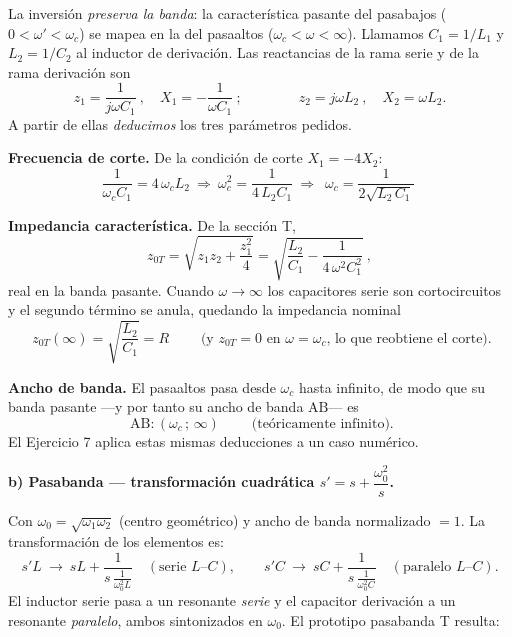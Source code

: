 \documentclass[class=article, crop=false, oneside]{standalone}
\begin{document}
\begin{figure}[H]
    \centering
    
\end{figure}

\noindent La inversión \emph{preserva la banda}: la característica pasante del
pasabajos ($0<\omega'<\omega_c$) se mapea en la del pasaaltos ($\omega_c<\omega<\infty$).
Llamamos $C_1 = 1/L_1$ y $L_2 = 1/C_2$ al inductor de derivación. Las reactancias
de la rama serie y de la rama derivación son
\[
    z_1 = \frac{1}{j\omega C_1}\ ,\quad X_1 = -\frac{1}{\omega C_1}\ ;\qquad\qquad
    z_2 = j\omega L_2\ ,\quad X_2 = \omega L_2 .
\]
A partir de ellas \emph{deducimos} los tres parámetros pedidos.

\noindent\textbf{Frecuencia de corte.} De la condición de corte $X_1 = -4X_2$:
\[
    \frac{1}{\omega_c C_1} = 4\,\omega_c L_2
    \ \Longrightarrow\ \omega_c^2 = \frac{1}{4\,L_2 C_1}
    \ \Longrightarrow\ \boxed{\;\omega_c = \frac{1}{2\sqrt{L_2\,C_1}}\;}
\]

\noindent\textbf{Impedancia característica.} De la sección T,
\[
    z_{0T} = \sqrt{z_1 z_2 + \frac{z_1^2}{4}}
           = \sqrt{\frac{L_2}{C_1} - \frac{1}{4\,\omega^2 C_1^2}}\ ,
\]
real en la banda pasante. Cuando $\omega\to\infty$ los capacitores serie son
cortocircuitos y el segundo término se anula, quedando la impedancia nominal
\[
    \boxed{\;z_{0T}(\infty) = \sqrt{\frac{L_2}{C_1}} = R\;}\qquad
    \text{(y } z_{0T}=0 \text{ en } \omega=\omega_c\text{, lo que reobtiene el corte).}
\]

\noindent\textbf{Ancho de banda.} El pasaaltos pasa desde $\omega_c$ hasta infinito,
de modo que su banda pasante ---y por tanto su ancho de banda $\text{AB}$--- es
\[
    \boxed{\;\text{AB}: (\omega_c\,;\,\infty)\;}\qquad\text{(teóricamente infinito).}
\]
El Ejercicio 7 aplica estas mismas deducciones a un caso numérico.

\medskip
\noindent\textbf{b) Pasabanda --- transformación cuadrática $s' = s + \dfrac{\omega_0^2}{s}$.}\par
Con $\omega_0 = \sqrt{\omega_1\omega_2}$ (centro geométrico) y ancho de banda
normalizado $=1$. La transformación de los elementos es:
\[
    s'L\ \longrightarrow\ sL + \frac{1}{s\,\frac{1}{\omega_0^2 L}}
    \quad(\text{serie } L\text{--}C),
    \qquad
    s'C\ \longrightarrow\ sC + \frac{1}{s\,\frac{1}{\omega_0^2 C}}
    \quad(\text{paralelo } L\text{--}C).
\]
El inductor serie pasa a un resonante \emph{serie} y el capacitor derivación a un
resonante \emph{paralelo}, ambos sintonizados en $\omega_0$. El prototipo
pasabanda T resulta:
\end{document}
